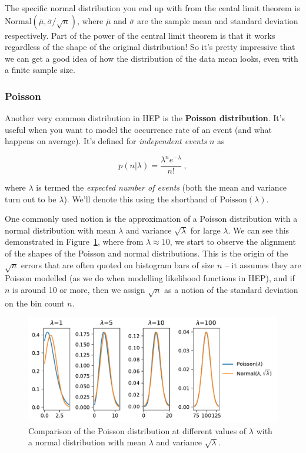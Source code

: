 \documentclass[
  11pt,
  numbers=noendperiod]{book}
\begin{document}
The specific normal distribution you end up with from the cental limit
theorem is \(\mathrm{Normal}(\bar{\mu}, \bar{\sigma}/\sqrt{n})\), where
\(\bar{\mu}\) and \(\bar{\sigma}\) are the sample mean and standard
deviation respectively. Part of the power of the central limit theorem
is that it works regardless of the shape of the original distribution!
So it's pretty impressive that we can get a good idea of how the
distribution of the data mean looks, even with a finite sample size.

\hypertarget{sec-poisson}{%
\subsubsection*{Poisson}\label{sec-poisson}}

Another very common distribution in HEP is the \textbf{Poisson
distribution}. It's useful when you want to model the occurrence rate of
an event (and what happens on average). It's defined for
\emph{independent events} \(n\) as

\[p(n | \lambda) = \frac{\lambda^n e^{-\lambda}}{n!}~,\]

where \(\lambda\) is termed the \emph{expected number of events} (both
the mean and variance turn out to be \(\lambda\)). We'll denote this
using the shorthand of \(\mathrm{Poisson}(\lambda)\).

One commonly used notion is the approximation of a Poisson distribution
with a normal distribution with mean \(\lambda\) and variance
\(\sqrt{\lambda}\) for large \(\lambda\). We can see this demonstrated
in Figure~\ref{fig-poisson}, where from \(\lambda \approx 10\), we start
to observe the alignment of the shapes of the Poisson and normal
distributions. This is the origin of the \(\sqrt{n}\) errors that are
often quoted on histogram bars of size \(n\) -- it assumes they are
Poisson modelled (as we do when modelling likelihood functions in HEP),
and if \(n\) is around 10 or more, then we assign \(\sqrt{n}\) as a
notion of the standard deviation on the bin count \(n\).

\begin{figure}

{\centering \includegraphics{./stat-fundamentals_files/figure-pdf/fig-poisson-output-1.pdf}

}

\caption{\label{fig-poisson}Comparison of the Poisson distribution at
different values of \(\lambda\) with a normal distribution with mean
\(\lambda\) and variance \(\sqrt{\lambda}\).}

\end{figure}
\end{document}
